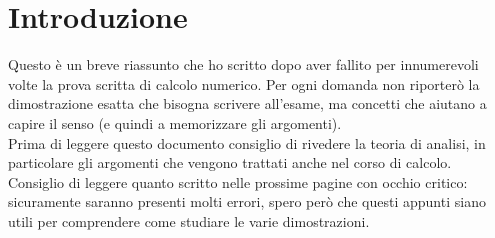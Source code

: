 \section{Introduzione}
Questo è un breve riassunto che ho scritto dopo aver fallito per innumerevoli volte la prova scritta di calcolo numerico. Per ogni domanda non riporterò la dimostrazione esatta che bisogna scrivere all'esame, ma concetti che aiutano a capire il senso (e quindi a memorizzare gli argomenti).\\
Prima di leggere questo documento consiglio di rivedere la teoria di analisi, in particolare gli argomenti che vengono trattati anche nel corso di calcolo.\\
Consiglio di leggere quanto scritto nelle prossime pagine con occhio critico: sicuramente saranno presenti molti errori, spero però che questi appunti siano utili per comprendere come studiare le varie dimostrazioni.